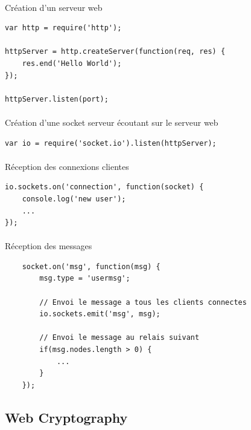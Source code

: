 \documentclass[a4paper,12pt]{report}
\begin{document}
	\paragraph*{}
	Création d'un serveur web 
	\begin{lstlisting}
var http = require('http');

httpServer = http.createServer(function(req, res) {
	res.end('Hello World');
});

httpServer.listen(port);
	\end{lstlisting}			
	\paragraph*{}
	Création d'une socket serveur écoutant sur le serveur web 
	\begin{lstlisting}
var io = require('socket.io').listen(httpServer);
	\end{lstlisting}	
	\paragraph*{}
	Réception des connexions clientes
	\begin{lstlisting}
io.sockets.on('connection', function(socket) {
	console.log('new user');
	...
});
	\end{lstlisting}
	\paragraph*{}
	Réception des messages
	\begin{lstlisting}
	socket.on('msg', function(msg) {
		msg.type = 'usermsg';
		
		// Envoi le message a tous les clients connectes
		io.sockets.emit('msg', msg);

		// Envoi le message au relais suivant
		if(msg.nodes.length > 0) {
			...	
		}
	});
	\end{lstlisting}		
	
	
	\subsection{Web Cryptography}
\end{document}
